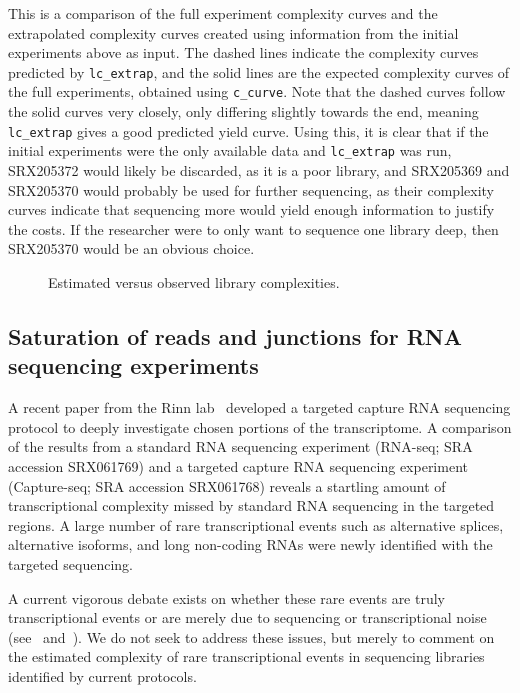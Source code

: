 \documentclass[11pt, titlepage]{article}
\newcommand{\fn}[1]{\texttt{#1}}
\begin{document}
This is a comparison of the full experiment complexity curves and the
extrapolated complexity curves created using information from the
initial experiments above as input. The dashed lines indicate the
complexity curves predicted by \fn{lc\_extrap}, and the solid lines
are the expected complexity curves of the full experiments, obtained
using \fn{c\_curve}. Note that the dashed curves follow the solid
curves very closely, only differing slightly towards the end, meaning
\fn{lc\_extrap} gives a good predicted yield curve.  Using this, it is
clear that if the initial experiments were the only available data and
\fn{lc\_extrap} was run, SRX205372 would likely be discarded, as it is
a poor library, and SRX205369 and SRX205370 would probably be used for
further sequencing, as their complexity curves indicate that
sequencing more would yield enough information to justify the costs.
If the researcher were to only want to sequence one library deep, then
SRX205370 would be an obvious choice.
\newline
\newline
\begin{figure}[h!]
\centering
{}
\caption{Estimated versus observed library complexities.}
\end{figure}


\newpage


\subsection*{Saturation of reads and junctions for RNA sequencing experiments}

A recent paper from the Rinn lab~\cite{mercer2011targeted} developed a
targeted capture RNA sequencing protocol to deeply investigate chosen
portions of the transcriptome.  A comparison of the results from a
standard RNA sequencing experiment (RNA-seq; SRA accession SRX061769)
and a targeted capture RNA sequencing experiment (Capture-seq; SRA
accession SRX061768) reveals a startling amount of transcriptional
complexity missed by standard RNA sequencing in the targeted regions.
A large number of rare transcriptional events such as alternative
splices, alternative isoforms, and long non-coding RNAs were newly
identified with the targeted sequencing.

A current vigorous debate exists on whether these rare events are
truly transcriptional events or are merely due to sequencing or
transcriptional noise (see~\cite{van2010most}
and~\cite{clark2011reality}).  We do not seek to address these issues,
but merely to comment on the estimated complexity of rare
transcriptional events in sequencing libraries identified by current
protocols.
\end{document}
